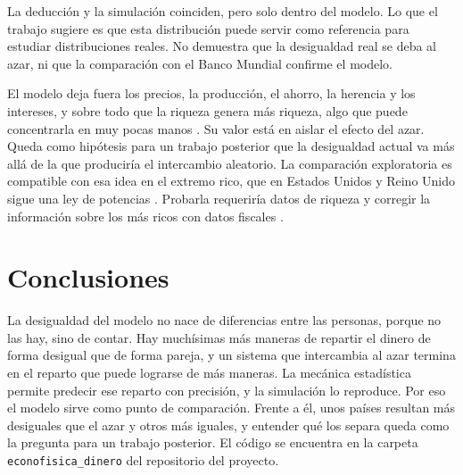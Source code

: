 \documentclass[letterpaper,12pt]{article}
\begin{document}
La deducción y la simulación coinciden, pero solo dentro del modelo. Lo que el trabajo sugiere es que esta distribución puede servir como referencia para estudiar distribuciones reales. No demuestra que la desigualdad real se deba al azar, ni que la comparación con el Banco Mundial confirme el modelo.

El modelo deja fuera los precios, la producción, el ahorro, la herencia y los intereses, y sobre todo que la riqueza genera más riqueza, algo que puede concentrarla en muy pocas manos \cite{bm2000}. Su valor está en aislar el efecto del azar. Queda como hipótesis para un trabajo posterior que la desigualdad actual va más allá de la que produciría el intercambio aleatorio. La comparación exploratoria es compatible con esa idea en el extremo rico, que en Estados Unidos y Reino Unido sigue una ley de potencias \cite{dy2001}. Probarla requeriría datos de riqueza y corregir la información sobre los más ricos con datos fiscales \cite{enigh,wid}.

\section*{Conclusiones}
La desigualdad del modelo no nace de diferencias entre las personas, porque no las hay, sino de contar. Hay muchísimas más maneras de repartir el dinero de forma desigual que de forma pareja, y un sistema que intercambia al azar termina en el reparto que puede lograrse de más maneras. La mecánica estadística permite predecir ese reparto con precisión, y la simulación lo reproduce. Por eso el modelo sirve como punto de comparación. Frente a él, unos países resultan más desiguales que el azar y otros más iguales, y entender qué los separa queda como la pregunta para un trabajo posterior. El código se encuentra en la carpeta \texttt{econofisica\_dinero} del repositorio del proyecto.
\end{document}
